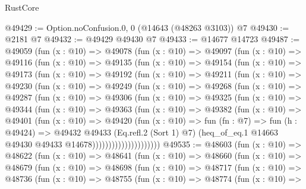 \begin{lexlean}{RustCore}
\begin{coremodule}
@49429 := Option.noConfusion.{0, 0} (@14643 (@48263 @3103)) @7
@49430 := @2181 @7
@49432 := @49429 @49430 @7
@49433 := @14677 @14723
@49487 := @49059
    (fun (x : @10) =>
    @49078
      (fun (x : @10) =>
      @49097
        (fun (x : @10) =>
        @49116
          (fun (x : @10) =>
          @49135
            (fun (x : @10) =>
            @49154
              (fun (x : @10) =>
              @49173
                (fun (x : @10) =>
                @49192
                  (fun (x : @10) =>
                  @49211
                    (fun (x : @10) =>
                    @49230
                      (fun (x : @10) =>
                      @49249
                        (fun (x : @10) =>
                        @49268
                          (fun (x : @10) =>
                          @49287
                            (fun (x : @10) =>
                            @49306
                              (fun (x : @10) =>
                              @49325
                                (fun (x : @10) =>
                                @49344
                                  (fun (x : @10) =>
                                  @49363
                                    (fun (x : @10) =>
                                    @49382
                                      (fun (x : @10) =>
                                      @49401
                                        (fun (x : @10) =>
                                        @49420
                                          (fun (x : @10) =>
                                          fun (fn : @7) =>
                                          fun (h : @49424) =>
                                          @49432
                                            @49433
                                            (Eq.refl.{2} (Sort 1) @7)
                                            (heq_of_eq.{1}
                                              @14663
                                              @49430
                                              @49433
                                              @14678)))))))))))))))))))))
@49535 := @48603
    (fun (x : @10) =>
    @48622
      (fun (x : @10) =>
      @48641
        (fun (x : @10) =>
        @48660
          (fun (x : @10) =>
          @48679
            (fun (x : @10) =>
            @48698
              (fun (x : @10) =>
              @48717
                (fun (x : @10) =>
                @48736
                  (fun (x : @10) =>
                  @48755
                    (fun (x : @10) =>
                    @48774
                      (fun (x : @10) =>

\end{coremodule}
\end{lexlean}
